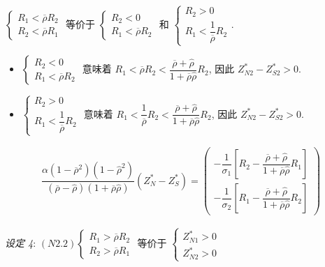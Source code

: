 \documentclass[10.0pt]{article}
\begin{document}
$ \left\{ \begin{matrix} R_1 < \overline{\rho} R_2 \\ R_2 < \overline{\rho} R_1 \end{matrix} \right. $ 等价于 $ \left\{ \begin{matrix} R_2 < 0 \\ R_1 < \overline{\rho} R_2 \end{matrix} \right. $ 和 $ \left\{ \begin{matrix} R_2 > 0 \\ R_1 < \dfrac{1}{\overline{\rho}} R_2 \end{matrix} \right. $. 
\begin{itemize}
\item $ \left\{ \begin{matrix} R_2 < 0 \\ R_1 < \overline{\rho} R_2 \end{matrix} \right. $ 意味着 $ R_1 < \overline{\rho} R_2 < \dfrac{\overline{\rho} + {\hat \rho}}{1 + \overline{\rho} {\hat \rho}} R_2 $, 因此 $ Z_{N 2}^* - Z_{S 2}^* > 0 $.
\item $ \left\{ \begin{matrix} R_2 > 0 \\ R_1 < \dfrac{1}{\overline{\rho}} R_2 \end{matrix} \right. $ 意味着 $ R_1 < \dfrac{1}{\overline{\rho}} R_2 < \dfrac{\overline{\rho} + {\hat \rho}}{1 + \overline{\rho} {\hat \rho}} R_2 $, 因此 $ Z_{N 2}^* - Z_{S 2}^* > 0 $.
\end{itemize}

\begin{eqnarray*}
\dfrac{\alpha (1 - \overline{\rho}^2) (1 - {\hat \rho}^2)}{(\overline{\rho} - {\hat \rho}) (1 + \overline{\rho} {\hat \rho})} (Z_N^* - Z_S^*) = \left( \begin{matrix} - \dfrac{1}{\sigma_1} \left[ R_2 - \dfrac{\overline{\rho} + {\hat \rho}}{1 + \overline{\rho} {\hat \rho}} R_1 \right] \\ - \dfrac{1}{\sigma_2} \left[ R_1 - \dfrac{\overline{\rho} + {\hat \rho}}{1 + \overline{\rho} {\hat \rho}} R_2 \right] \end{matrix} \right)
\end{eqnarray*}

{\it 设定 4}: $ (N2.2) \left\{ \begin{matrix} R_1 > \overline{\rho} R_2 \\ R_2 > \overline{\rho} R_1 \end{matrix} \right. $ 等价于 $ \left\{ \begin{matrix} Z_{N 1}^* > 0 \\ Z_{N 2}^* > 0 \end{matrix} \right. $
\end{document}
